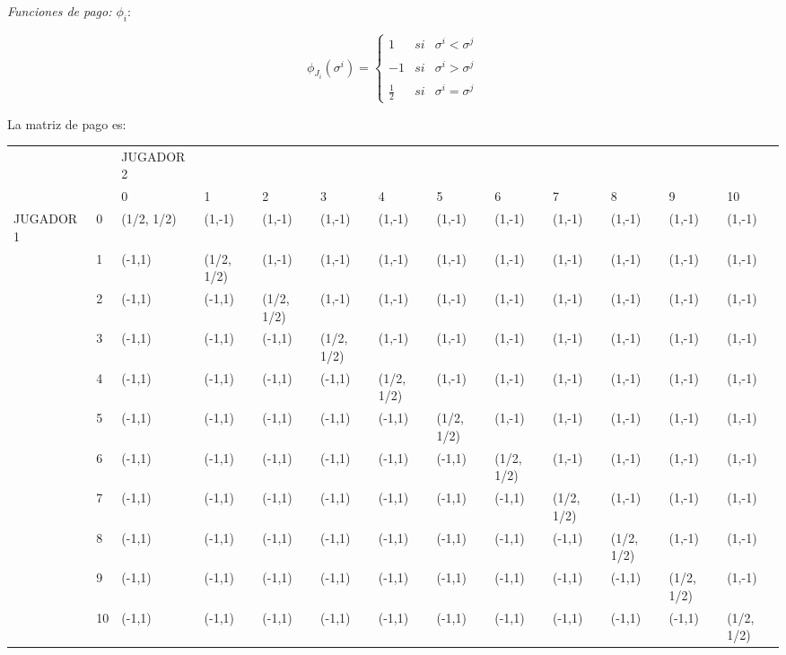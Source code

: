 \documentclass{homework}
\begin{document}
\emph{Funciones de pago: $\phi_i $}: 

\begin{equation}
    \phi_{J_i} (\sigma^i)= \left\{ \begin{array}{lcc}
             1 &   si  & \sigma^i < \sigma^j \\
             \\ -1 &  si & \sigma^i > \sigma^j \\
             \\ \frac{1}{2} &  si  & \sigma^i = \sigma^j
             \end{array}
   \right.
\end{equation}


La matriz de pago es:

\begin{table}[h]
\begin{adjustbox}{width=\columnwidth,center}
\begin{tabular}{lllllllllllll}
 &  & JUGADOR 2 &  &  &  &  &  &  &  &  &  &  \\
 &  & 0 & 1 & 2 & 3 & 4 & 5 & 6 & 7 & 8 & 9 & 10 \\
JUGADOR 1 & 0 & (1/2, 1/2) & (1,-1) & (1,-1) & (1,-1) & (1,-1) & (1,-1) & (1,-1) & (1,-1) & (1,-1) & (1,-1) & (1,-1) \\
 & 1 & (-1,1) & (1/2, 1/2) & (1,-1) & (1,-1) & (1,-1) & (1,-1) & (1,-1) & (1,-1) & (1,-1) & (1,-1) & (1,-1) \\
 & 2 & (-1,1) & (-1,1) & (1/2, 1/2) & (1,-1) & (1,-1) & (1,-1) & (1,-1) & (1,-1) & (1,-1) & (1,-1) & (1,-1) \\
 & 3 & (-1,1) & (-1,1) & (-1,1) & (1/2, 1/2) & (1,-1) & (1,-1) & (1,-1) & (1,-1) & (1,-1) & (1,-1) & (1,-1) \\
 & 4 & (-1,1) & (-1,1) & (-1,1) & (-1,1) & (1/2, 1/2) & (1,-1) & (1,-1) & (1,-1) & (1,-1) & (1,-1) & (1,-1) \\
 & 5 & (-1,1) & (-1,1) & (-1,1) & (-1,1) & (-1,1) & (1/2, 1/2) & (1,-1) & (1,-1) & (1,-1) & (1,-1) & (1,-1) \\
 & 6 & (-1,1) & (-1,1) & (-1,1) & (-1,1) & (-1,1) & (-1,1) & (1/2, 1/2) & (1,-1) & (1,-1) & (1,-1) & (1,-1) \\
 & 7 & (-1,1) & (-1,1) & (-1,1) & (-1,1) & (-1,1) & (-1,1) & (-1,1) & (1/2, 1/2) & (1,-1) & (1,-1) & (1,-1) \\
 & 8 & (-1,1) & (-1,1) & (-1,1) & (-1,1) & (-1,1) & (-1,1) & (-1,1) & (-1,1) & (1/2, 1/2) & (1,-1) & (1,-1) \\
 & 9 & (-1,1) & (-1,1) & (-1,1) & (-1,1) & (-1,1) & (-1,1) & (-1,1) & (-1,1) & (-1,1) & (1/2, 1/2) & (1,-1) \\
 & 10 & (-1,1) & (-1,1) & (-1,1) & (-1,1) & (-1,1) & (-1,1) & (-1,1) & (-1,1) & (-1,1) & (-1,1) & (1/2, 1/2) \\
\end{tabular}
\end{adjustbox}
\end{table}
\end{document}
